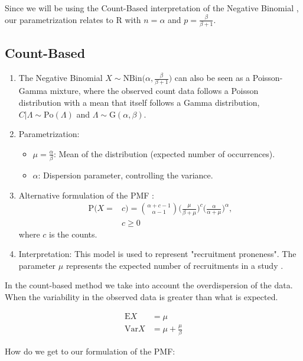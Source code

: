 Since we will be using the Count-Based interpretation of the Negative Binomial \citep{hilbe2011negative}, our parametrization relates to R with $n = \alpha$ and $p = \frac{\beta}{\beta+1}$.

\subsection{Count-Based}
\begin{enumerate}
\item The Negative Binomial $X\sim\textrm{NBin}\Bigg(\alpha,\frac{\beta}{\beta+1}\Bigg)$ can also be seen as a Poisson-Gamma mixture, where the observed count data follows a Poisson distribution with a mean that itself follows a Gamma distribution, $C|\Lambda \sim \textrm{Po}(\Lambda)$ and $\Lambda \sim \textrm{G}(\alpha,\beta)$. 
\item Parametrization:
	\begin{itemize}
	\item $\mu = \frac{\alpha}{\beta}$: Mean of the distribution (expected number of occurrences).
	\item $\alpha$: Dispersion parameter, controlling the variance.
	\end{itemize}
\item Alternative formulation of the PMF \citep{hilbe2011negative}:
\begin{align*}
\textrm{P}(X=&c) = \binom{\alpha+c-1}{\alpha-1}\Bigg (\frac{\mu}{\beta+\mu}\Bigg)^{c} \Bigg(\frac{\alpha}{\alpha+\mu}\Bigg)^{\alpha}, \\
&c\geq 0 
\end{align*}
where $c$ is the counts.
\item Interpretation: This model is used to represent "recruitment proneness". The parameter $\mu$ represents the expected number of recruitments in a study \citep{johnson2005univariate}.

\end{enumerate}

In the count-based method we take into account the overdispersion of the data. When the variability in the observed data is greater than what is expected.

\begin{align*}
\textrm{E}X&=\mu\\
\textrm{Var}X&=\mu + \frac{\mu}{\beta}
\end{align*}

How do we get to our formulation of the PMF:

